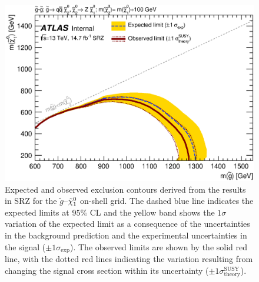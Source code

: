 \begin{figure}[htbp]
\centering
\includegraphics[width=.8\textwidth]{figures/interpretation/excl_SM_GG_N2.eps}
\caption{
Expected and observed exclusion contours derived from the results in SRZ for the $\tilde{g}$--$\tilde{\chi}_1^0$ on-shell grid. 
The dashed blue line indicates the expected limits at $95\%$ CL and the yellow band shows the $1\sigma$ variation of the expected limit as a consequence of the uncertainties in the background prediction and the experimental uncertainties in the signal ($\pm1\sigma_\text{exp}$). 
The observed limits are shown by the solid red line, with the dotted red lines indicating the variation resulting from changing the signal cross section within its uncertainty ($\pm1\sigma^\text{SUSY}_\text{theory}$).
\label{fig:excl_SMGGN2}
}
\end{figure}

